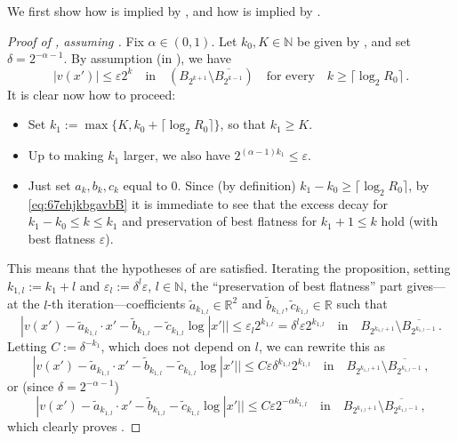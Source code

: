 \documentclass{article}
\newcommand{\N}{\mathbb{N}}
\newcommand{\R}{\mathbb{R}}
\newcommand{\ep}{\varepsilon}
\theoremstyle{definition}
\begin{document}
We first show how  is implied by , and how  is implied by .
\begin{proof}[Proof of , assuming ]
    Fix $\alpha\in (0,1)$. Let $k_0,K\in\N$ be given by , and set $\delta=2^{-\alpha-1}$. By assumption (in ), we have
    \begin{equation}\label{eq:67ehjkbgavbB}
        |v(x')|\leq \ep 2^k \quad\mbox{in}\quad (B_{2^{k+1}}\setminus \overline{B_{2^{k-1}}})\quad\mbox{for every}\quad k\geq \lceil \log_2{R_0}\rceil\,.
    \end{equation}
    It is clear now how to proceed:
    \begin{itemize}
        \item Set $k_1:=\max\{K,k_0+\lceil \log_2{R_0}\rceil\}$, so that $k_1\geq K$.
        \item Up to making $k_1$ larger, we also have $2^{(\alpha-1)k_1}\leq \ep$.
        \item Just set $a_k,b_k,c_k$ equal to $0$. Since (by definition) $k_1-k_0\geq \lceil \log_2{R_0}\rceil$, by \eqref{eq:67ehjkbgavbB} it is immediate to see that the excess decay for $k_1-k_0\leq k \leq k_1$ and preservation of best flatness for $k_1+1\leq k$ hold (with best flatness $\ep$).
    \end{itemize}
    This means that the hypotheses of  are satisfied. Iterating the proposition, setting $k_{1,l}:=k_1+l$ and $\ep_l:=\delta^l \ep$, $l\in\N$, the ``preservation of best flatness'' part gives---at the $l$-th iteration---coefficients $\widetilde a_{k_{1,l}}\in\R^2$ and $\widetilde b_{k_{1,l}},\widetilde c_{k_{1,l}}\in\R$ such that
    $$|v(x')-\widetilde a_{k_{1,l}}\cdot x'-\widetilde b_{k_{1,l}}-\widetilde c_{k_{1,l}}\log |x'||\leq \ep_l2^{k_{1,l}}= \delta^l \ep 2^{k_{1,l}}\quad\mbox{in}\quad  B_{2^{k_{1,l}+1}}\setminus \overline{B_{2^{k_{1,l}-1}}}\,.$$
    Letting $C:=\delta^{-k_1}$, which does not depend on $l$, we can rewrite this as
    $$|v(x')-\widetilde a_{k_{1,l}}\cdot x'-\widetilde b_{k_{1,l}}-\widetilde c_{k_{1,l}}\log |x'||\leq  C\ep\delta^{k_{1,l}} 2^{k_{1,l}}\quad\mbox{in}\quad B_{2^{k_{1,l}+1}}\setminus \overline{B_{2^{k_{1,l}-1}}}\,,$$
    or (since $\delta=2^{-\alpha-1}$)
    $$|v(x')-\widetilde a_{k_{1,l}}\cdot x'-\widetilde b_{k_{1,l}}-\widetilde c_{k_{1,l}}\log |x'||\leq  C\ep 2^{-\alpha k_{1,l}}\quad\mbox{in}\quad  B_{2^{k_{1,l}+1}}\setminus \overline{B_{2^{k_{1,l}-1}}}\,,$$
    which clearly proves .
\end{proof}
\end{document}
